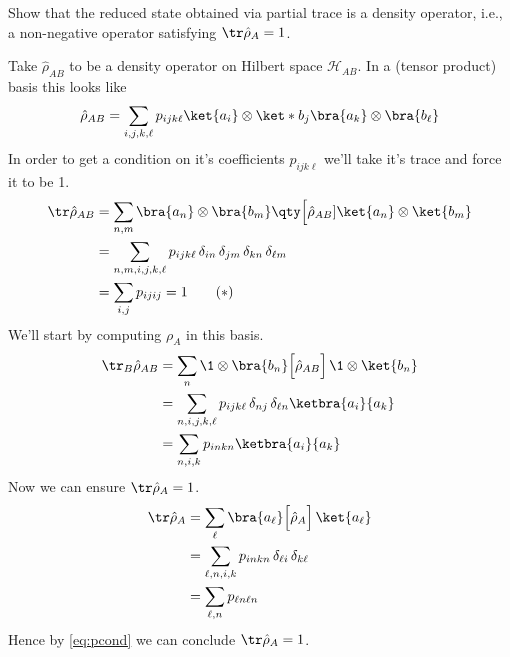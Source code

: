 \documentclass[
	pages,
	boxes,
	color=RoyalPurple
]{homework}
\makeatletter
\numberwithin{tcb@cnt@prob}{section}
\makeatother
\begin{document}
\begin{acronym}
\end{acronym}

\setcounter{section}{2}

\begin{problem}
Show that the reduced state obtained via partial trace is a density operator, i.e., a non-negative operator satisfying $\tr\hat{\rho}_A = 1$.
\end{problem}

\begin{solution}
    Take $\hat{\rho}_{AB}$ to be a density operator on Hilbert space $\mathcal{H}_{AB}$. In a (tensor product) basis this looks like
    \begin{equation*}
        \hat{\rho}_{AB} = \sum_{i,j,k,\ell}p_{ijk\ell}\ket{a_i}\otimes\ket*{b_j}\bra{a_k}\otimes\bra{b_\ell}
    \end{equation*}
    In order to get a condition on it's coefficients $p_{ijk\ell}$ we'll take it's trace and force it to be 1.
    \begin{align}
        \tr\hat{\rho}_{AB} & = \sum_{n, m}\bra{a_n}\otimes\bra{b_m}\qty\Big[\hat{\rho}_{AB}]\ket{a_n}\otimes\ket{b_m} \nonumber        \\
                           & = \sum_{n, m, i, j, k, \ell}p_{ijk\ell}\,\delta_{in}\,\delta_{jm}\,\delta_{kn}\,\delta_{\ell m} \nonumber \\
                           & = \sum_{i, j}p_{ijij} = 1 \tag{$*$}\label{eq:pcond}
    \end{align}
    We'll start by computing $\rho_{A}$ in this basis.
    \begin{align*}
        \tr_B\hat{\rho}_{AB} & = \sum_{n}\1\otimes\bra{b_n}\Big[\hat{\rho}_{AB}\Big]\, \1\otimes\ket{b_n}          \\
                             & = \sum_{n, i, j, k, \ell}p_{ijk\ell}\,\delta_{nj}\,\delta_{\ell n}\ketbra{a_i}{a_k} \\
                             & = \sum_{n, i, k}p_{inkn}\ketbra{a_i}{a_k}
    \end{align*}
    Now we can ensure $\tr\hat{\rho}_A = 1$.
    \begin{align*}
        \tr\hat{\rho}_A & = \sum_\ell \bra{a_\ell}\Big[\hat{\rho}_A\Big]\,\ket{a_\ell}    \\
                        & = \sum_{\ell, n, i, k}p_{inkn}\,\delta_{\ell i}\,\delta_{k\ell} \\
                        & = \sum_{\ell, n}p_{\ell n \ell n}
    \end{align*}
    Hence by \cref{eq:pcond} we can conclude $\tr\hat{\rho}_A = 1$.


\end{solution}
\end{document}
